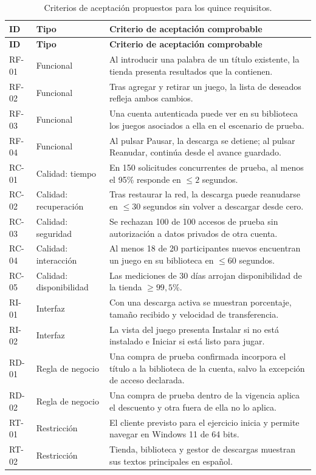 \documentclass[12pt,a4paper]{article}
\begin{document}
\small
\begin{longtable}{L{1.3cm}L{2.8cm}L{9.4cm}}
\caption{Criterios de aceptación propuestos para los quince requisitos.}\label{tab:criterios}\\
\toprule
\textbf{ID} & \textbf{Tipo} & \textbf{Criterio de aceptación comprobable}\\
\midrule\endfirsthead
\toprule\textbf{ID} & \textbf{Tipo} & \textbf{Criterio de aceptación comprobable}\\
\midrule\endhead
RF-01 & Funcional & Al introducir una palabra de un título existente, la tienda presenta resultados que la contienen.\\
RF-02 & Funcional & Tras agregar y retirar un juego, la lista de deseados refleja ambos cambios.\\
RF-03 & Funcional & Una cuenta autenticada puede ver en su biblioteca los juegos asociados a ella en el escenario de prueba.\\
RF-04 & Funcional & Al pulsar Pausar, la descarga se detiene; al pulsar Reanudar, continúa desde el avance guardado.\\
RC-01 & Calidad: tiempo & En 150 solicitudes concurrentes de prueba, al menos el 95\% responde en $\leq 2$ segundos.\\
RC-02 & Calidad: recuperación & Tras restaurar la red, la descarga puede reanudarse en $\leq 30$ segundos sin volver a descargar desde cero.\\
RC-03 & Calidad: seguridad & Se rechazan 100 de 100 accesos de prueba sin autorización a datos privados de otra cuenta.\\
RC-04 & Calidad: interacción & Al menos 18 de 20 participantes nuevos encuentran un juego en su biblioteca en $\leq 60$ segundos.\\
RC-05 & Calidad: disponibilidad & Las mediciones de 30 días arrojan disponibilidad de la tienda $\geq 99,5\%$.\\
RI-01 & Interfaz & Con una descarga activa se muestran porcentaje, tamaño recibido y velocidad de transferencia.\\
RI-02 & Interfaz & La vista del juego presenta Instalar si no está instalado e Iniciar si está listo para jugar.\\
RD-01 & Regla de negocio & Una compra de prueba confirmada incorpora el título a la biblioteca de la cuenta, salvo la excepción de acceso declarada.\\
RD-02 & Regla de negocio & Una compra de prueba dentro de la vigencia aplica el descuento y otra fuera de ella no lo aplica.\\
RT-01 & Restricción & El cliente previsto para el ejercicio inicia y permite navegar en Windows 11 de 64 bits.\\
RT-02 & Restricción & Tienda, biblioteca y gestor de descargas muestran sus textos principales en español.\\
\bottomrule
\end{longtable}
\normalsize
\end{document}
